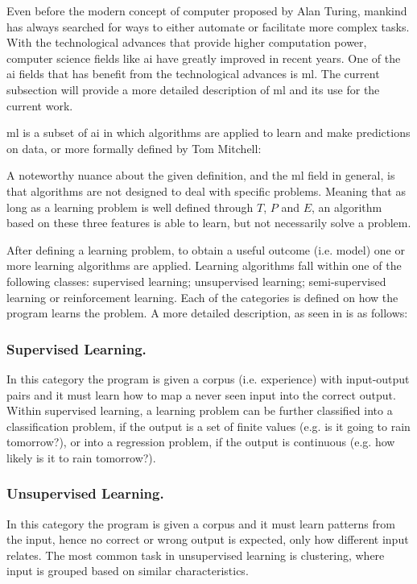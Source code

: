 Even before the modern concept of computer proposed by Alan Turing, mankind has always searched for ways to either automate or facilitate more complex tasks. With the technological advances that provide higher computation power, computer science fields like \gls{ai} have greatly improved in recent years. One of the \gls{ai} fields that has benefit from the technological advances is \gls{ml}. The current subsection will provide a more detailed description of \gls{ml} and its use for the current work.

\gls{ml} is a subset of \gls{ai} in which algorithms are applied to learn and make predictions on data, or more formally defined by Tom Mitchell\cite{mitchell:ml}:\\

A noteworthy nuance about the given definition, and the \gls{ml} field in general, is that algorithms are not designed to deal with specific problems. Meaning that as long as a learning problem is well defined through $T$, $P$ and $E$, an algorithm based on these three features is able to learn, but not necessarily solve a problem.

After defining a learning problem, to obtain a useful outcome (i.e. model) one or more learning algorithms are applied. Learning algorithms fall within one of the following classes: supervised learning; unsupervised learning; semi-supervised learning or reinforcement learning. Each of the categories is defined on how the program learns the problem. A more detailed description, as seen in \cite{norvig:ai} is as follows:

\subsubsection{Supervised Learning.} In this category the program is given a corpus (i.e. experience) with input-output pairs and it must learn how to map a never seen input into the correct output. Within supervised learning, a learning problem can be further classified into a classification problem, if the output is a set of finite values (e.g. is it going to rain tomorrow?), or into a regression problem, if the output is continuous (e.g. how likely is it to rain tomorrow?).

\subsubsection{Unsupervised Learning.} In this category the program is given a corpus and it must learn patterns from the input, hence no correct or wrong output is expected, only how different input relates. The most common task in unsupervised learning is clustering, where input is grouped based on similar characteristics.

